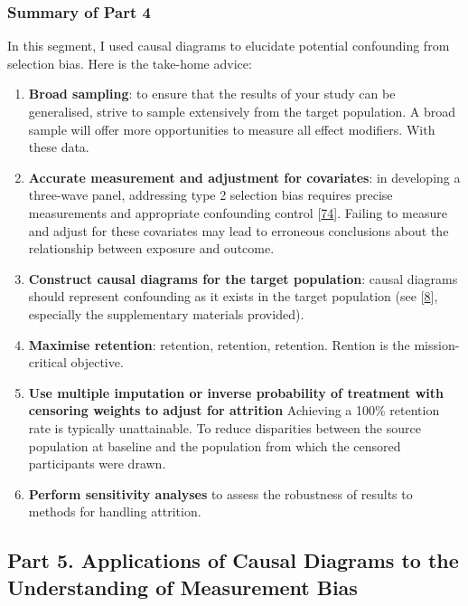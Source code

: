 \documentclass[
  singlecolumn]{article}
\begin{document}
\hypertarget{summary-of-part-4}{%
\subsubsection{Summary of Part 4}\label{summary-of-part-4}}

In this segment, I used causal diagrams to elucidate potential
confounding from selection bias. Here is the take-home advice:

\begin{enumerate}
\def\labelenumi{\arabic{enumi}.}
\item
  \textbf{Broad sampling}: to ensure that the results of your study can
  be generalised, strive to sample extensively from the target
  population. A broad sample will offer more opportunities to measure
  all effect modifiers. With these data.
\item
  \textbf{Accurate measurement and adjustment for covariates}: in
  developing a three-wave panel, addressing type 2 selection bias
  requires precise measurements and appropriate confounding control
  {[}\protect\hyperlink{ref-lu2022}{74}{]}. Failing to measure and
  adjust for these covariates may lead to erroneous conclusions about
  the relationship between exposure and outcome.
\item
  \textbf{Construct causal diagrams for the target population}: causal
  diagrams should represent confounding as it exists in the target
  population (see {[}\protect\hyperlink{ref-suzuki2020}{8}{]},
  especially the supplementary materials provided).
\item
  \textbf{Maximise retention}: retention, retention, retention. Rention
  is the mission-critical objective.
\item
  \textbf{Use multiple imputation or inverse probability of treatment
  with censoring weights to adjust for attrition} Achieving a 100\%
  retention rate is typically unattainable. To reduce disparities
  between the source population at baseline and the population from
  which the censored participants were drawn.
\item
  \textbf{Perform sensitivity analyses} to assess the robustness of
  results to methods for handling attrition.
\end{enumerate}

\hypertarget{part-5.-applications-of-causal-diagrams-to-the-understanding-of-measurement-bias}{%
\subsection{Part 5. Applications of Causal Diagrams to the Understanding
of Measurement
Bias}\label{part-5.-applications-of-causal-diagrams-to-the-understanding-of-measurement-bias}}
\end{document}
